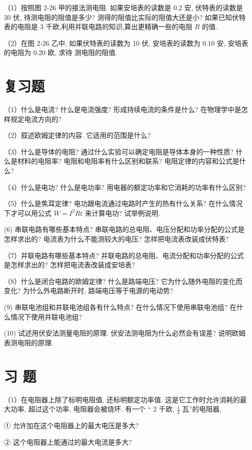 \documentclass[10pt]{article}
\begin{document}
（1）按照图 2-26 甲的接法测电阻. 如果安培表的读数是 0.2 安, 伏特表的读数是 30 伏, 待测电阻的阻值是多少? 测得的阻值比实际的阻值大还是小? 如果已知伏特表的电阻是 3 千欧,利用并联电路的知识,算出更精确一些的电阻 \(R\) 的值.

（2）在图 2-26 乙中, 如果伏特表的读数为 10 伏, 安培表的读数为 0.10 安, 安培表的电阻为 0.20 欧, 求待 测电阻的阻值.

\section*{复习题}

（1）什么是电流? 什么是电流强度? 形成持续电流的条件是什么? 在物理学中是怎样规定电流方向的?

（2）叙述欧姆定律的内容. 它适用的范围是什么?

（3）什么是导体的电阻? 通过什么实验可以确定电阻是导体本身的一种性质? 什么是材料的电阻率? 电阻和电阻率有什么区别和联系? 电阻定律的内容和公式是什么?

（4）什么是电功? 什么是电功率? 用电器的额定功率和它消耗的功率有什么区别?

（5）什么是焦耳定律? 电功跟电流通过电路时产生的热有什么关系? 在什么情况下才可以用公式 \(W = {I}^{2}{Rt}\) 来计算电功? 试举例说明.

(6) 串联电路有哪些基本特点? 串联电路的总电阻、电压分配和功率分配的公式是怎样求出的? 电流表为什么不能测较大的电压? 怎样把电流表改装成伏特表?

（7）并联电路有哪些基本特点? 并联电路的总电阻、电流分配和功率分配的公式是怎样求出的? 怎样把电流表改装成安培表?

（8）什么是闭合电路的欧姆定律? 什么是路端电压? 它为什么随外电阻的变化而变化? 为什么外电路断开时, 路端电压等于电源的电动势?

(9) 串联电池组和并联电池组各有什么特点? 在什么情况下使用串联电池组? 在什么情况下使用并联电池组?

(10) 试述用伏安法测量电阻的原理. 伏安法测电阻为什么必然会有误差? 说明欧姆表测电阻的原理.

\section*{习 题}

（1）在电阻器上除了标明电阻值, 还标明额定功率值. 这是它工作时允许消耗的最大功率, 超过这个功率, 电阻器会被烧坏. 有一个 “ 2 千欧, \(\frac{1}{4}\) 瓦”的电阻器,

① 允许加在这个电阻器上的最大电压是多大?

② 这个电阻器上能通过的最大电流是多大?
\end{document}
